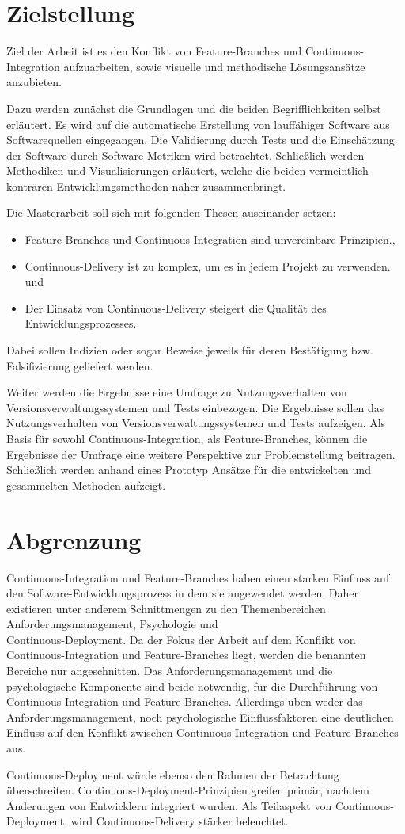 \section{Zielstellung}

Ziel der Arbeit ist es den Konflikt von \glqq Feature-Branches\grqq{} und \glqq Continuous-Integration\grqq{} aufzuarbeiten, sowie visuelle und methodische Lösungsansätze anzubieten. 

Dazu werden zunächst die Grundlagen und die beiden Begrifflichkeiten selbst erläutert. Es wird auf die automatische Erstellung von lauffähiger Software aus Softwarequellen eingegangen. Die Validierung durch Tests und die Einschätzung der Software durch Software-Metriken wird betrachtet. Schließlich werden Methodiken und Visualisierungen erläutert, welche die beiden vermeintlich konträren Entwicklungsmethoden näher zusammenbringt.

Die Masterarbeit soll sich mit folgenden Thesen auseinander setzen:
\begin{itemize}
\item \glqq Feature-Branches und Continuous-Integration sind unvereinbare Prinzipien.\grqq{},
\item \glqq Continuous-Delivery ist zu komplex, um es in jedem Projekt zu verwenden.\grqq{} und
\item \glqq Der Einsatz von Continuous-Delivery steigert die Qualität des Entwicklungsprozesses.\grqq{}
\end{itemize}
Dabei sollen Indizien oder sogar Beweise jeweils für deren Bestätigung bzw. Falsifizierung geliefert werden.

Weiter werden die Ergebnisse eine Umfrage zu \glqq Nutzungsverhalten von Versionsverwaltungssystemen und Tests\grqq{} einbezogen. Die Ergebnisse sollen das Nutzungsverhalten von Versionsverwaltungssystemen und Tests aufzeigen. Als Basis für sowohl Continuous-Integration, als Feature-Branches, können die Ergebnisse der Umfrage eine weitere Perspektive zur Problemstellung beitragen. Schließlich werden anhand eines Prototyp Ansätze für die entwickelten und gesammelten Methoden aufzeigt.

\section{Abgrenzung}

Continuous-Integration und Feature-Branches haben einen starken Einfluss auf den Software\hyp{}Entwicklungsprozess in dem sie angewendet werden. Daher existieren unter anderem Schnittmengen zu den Themenbereichen Anforderungsmanagement, Psychologie und \\Continuous-Deployment. 
Da der Fokus der Arbeit auf dem Konflikt von Continuous-Integration und Feature-Branches liegt, werden die benannten Bereiche nur angeschnitten. Das Anforderungsmanagement und die psychologische Komponente sind beide notwendig, für die Durchführung von Continuous-Integration und Feature-Branches. Allerdings üben weder das Anforderungsmanagement, noch psychologische Einflussfaktoren eine deutlichen Einfluss auf den Konflikt zwischen Continuous-Integration und Feature-Branches aus. 

Continuous-Deployment würde ebenso den Rahmen der Betrachtung überschreiten. Continuous-Deployment-Prinzipien greifen primär, nachdem Änderungen von Entwicklern integriert wurden. Als Teilaspekt von Continuous-Deployment, wird Continuous-Delivery stärker beleuchtet.